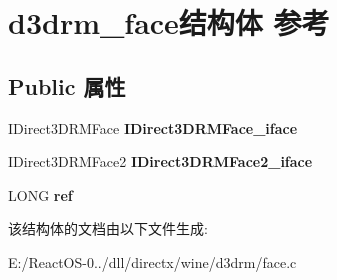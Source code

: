 \hypertarget{structd3drm__face}{}\section{d3drm\+\_\+face结构体 参考}
\label{structd3drm__face}
\subsection*{Public 属性}
\begin{DoxyCompactItemize}
\item 
\mbox{\label{structd3drm__face_a2c50781c54b719d2b3e5b343ca38b6ca}} 
I\+Direct3\+D\+R\+M\+Face {\bfseries I\+Direct3\+D\+R\+M\+Face\+\_\+iface}
\item 
\mbox{\label{structd3drm__face_a97b3ce24a679596d563eb1b83b32231a}} 
I\+Direct3\+D\+R\+M\+Face2 {\bfseries I\+Direct3\+D\+R\+M\+Face2\+\_\+iface}
\item 
\mbox{\label{structd3drm__face_a8078393b696d1ca19ffde9387b2cc807}} 
L\+O\+NG {\bfseries ref}
\end{DoxyCompactItemize}


该结构体的文档由以下文件生成\+:\begin{DoxyCompactItemize}
\item 
E\+:/\+React\+O\+S-\/0../dll/directx/wine/d3drm/face.\+c\end{DoxyCompactItemize}
